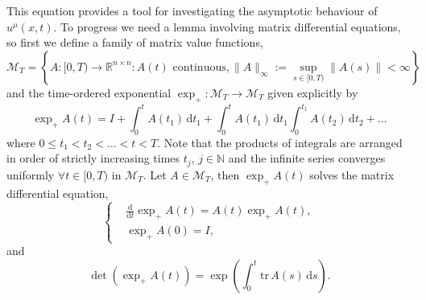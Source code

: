 \documentclass[a4paper,12pt,draft]{report}
\theoremstyle{remark}
\theoremstyle{definition}
\begin{document}
This equation provides a tool for investigating the asymptotic behaviour of $u^\mu(x, t)$.  To progress we need a lemma involving matrix differential equations, so first we define a family of matrix value functions,
$$
\mathcal{M}_T = \left\{ A: [0, T) \to \mathbb{R}^{n \times n} : A(t) \text{ continuous}, \|A\|_\infty := \sup_{s \in [0, T)} \|A(s)\| < \infty \right\}
$$
and the time-ordered exponential $\exp_+ : \mathcal{M}_T \to \mathcal{M}_T$ given explicitly by
$$
\exp_+ A(t) = I + \int_0^t A(t_1)\,\mathrm{d} t_1 + \int_0^t A(t_1)\,\mathrm{d} t_1 \int_0^{t_1} A(t_2)\,\mathrm{d} t_2 + \dots
$$
where $0 \le t_1 < t_2 < \dots < t < T$.  Note that the products of integrals are arranged in order of strictly increasing times $t_j$, $j\in \mathbb{N}$ and the infinite series converges uniformly $\forall t \in [0, T)$ in $\mathcal{M}_T$.
\lemma
{
Let $A \in \mathcal{M}_T$, then $\exp_+A(t)$ solves the matrix differential equation,
$$
\left\{
\begin{aligned}
& \frac{\mathrm{d}}{\mathrm{d}t}\exp_+A(t) = A(t)\exp_+A(t),\\
& \exp_+A(0) = I,
\end{aligned}
\right.
$$
and
$$
\det(\exp_+A(t)) = \exp \left( \int_0^t \mathrm{tr}\,A(s)\,\mathrm{d}s \right).
$$
}
\proof
\end{document}
